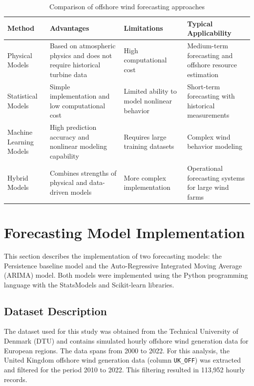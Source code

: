 \documentclass[12pt,a4paper]{article}
\begin{document}
\begin{table}[H]
\centering
\begin{tabular}{p{3cm}p{4cm}p{4cm}p{4cm}}
\toprule
\textbf{Method} & \textbf{Advantages} & \textbf{Limitations} & \textbf{Typical Applicability} \\
\midrule
Physical Models & Based on atmospheric physics and does not require historical turbine data & High computational cost & Medium-term forecasting and offshore resource estimation \\
\midrule
Statistical Models & Simple implementation and low computational cost & Limited ability to model nonlinear behavior & Short-term forecasting with historical measurements \\
\midrule
Machine Learning Models & High prediction accuracy and nonlinear modeling capability & Requires large training datasets & Complex wind behavior modeling \\
\midrule
Hybrid Models & Combines strengths of physical and data-driven models & More complex implementation & Operational forecasting systems for large wind farms \\
\bottomrule
\end{tabular}
\caption{Comparison of offshore wind forecasting approaches}
\label{tab:comparison}
\end{table}

\newpage

\section{Forecasting Model Implementation}

This section describes the implementation of two forecasting models: the Persistence baseline model and the Auto-Regressive Integrated Moving Average (ARIMA) model. Both models were implemented using the Python programming language with the StatsModels and Scikit-learn libraries.

\subsection{Dataset Description}

The dataset used for this study was obtained from the Technical University of Denmark (DTU) and contains simulated hourly offshore wind generation data for European regions. The data spans from 2000 to 2022. For this analysis, the United Kingdom offshore wind generation data (column \texttt{UK\_OFF}) was extracted and filtered for the period 2010 to 2022. This filtering resulted in 113,952 hourly records.
\end{document}
